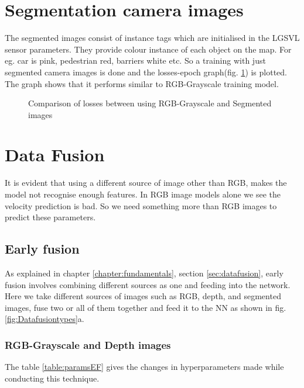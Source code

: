 \section{Segmentation camera images}
The segmented images consist of instance tags which are initialised in the LGSVL sensor
parameters. They provide colour instance of each object on the map. For eg. car is pink,
pedestrian red, barriers white etc. So a training with just segmented camera images is
done and the losses-epoch graph(fig. \ref{fig:colourvsseg1}) is plotted. The graph shows
that it performs similar to RGB-Grayscale training model.
\begin{figure}[!ht]
    \centering
    \def\svgwidth{\textwidth}
    \caption{Comparison of losses between using RGB-Grayscale and Segmented images}
    \label{fig:colourvsseg1}
\end{figure}
\section{Data Fusion}
It is evident that using a different source of image other than RGB, makes the model not
recognise enough features. In RGB image models alone we see the velocity prediction is bad. So we need
something more than RGB images to predict these parameters.

\subsection{Early fusion}
As explained in chapter \ref{chapter:fundamentals}, section \ref{sec:datafusion}, early
fusion involves combining different sources as one and feeding into the network. Here we
take different sources of images such as RGB, depth, and segmented images, fuse two or all
of them together and feed it to the NN as shown in fig. \ref{fig:Datafusiontypes}a.
\subsubsection*{RGB-Grayscale and Depth images}
The table \ref{table:paramsEF} gives the changes in hyperparameters made while conducting
this technique.

